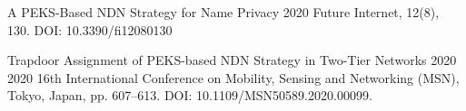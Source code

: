 \cvitem
{A PEKS-Based NDN Strategy for Name Privacy}
{2020}
{Future Internet, 12(8), 130. DOI: 10.3390/fi12080130}
{}

\cvitem
{Trapdoor Assignment of PEKS-based NDN Strategy in Two-Tier Networks}
{2020}
{2020 16th International Conference on Mobility, Sensing and Networking (MSN), Tokyo, Japan, pp. 607--613. DOI: 10.1109/MSN50589.2020.00099.}
{}
